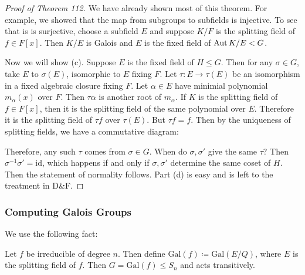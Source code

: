 \documentclass[10pt, twoside]{article}
\newcommand{\Gal}[1]{\mathrm{Gal}(#1)}
\begin{document}
    \begin{proof}[Proof of Theorem 112]
        We have already shown most of this theorem. For example, we showed that the map from subgroups to subfields is injective. To see that is is surjective, choose a subfield $E$ and suppose $K/F$ is the splitting field of $f \in F[x]$. Then $K/E$ is Galois and $E$ is the fixed field of $\operatorname{Aut}{K/E} < G$.

        Now we will show (c). Suppose $E$ is the fixed field of $H \leq G$. Then for any $\sigma \in G$, take $E$ to $\sigma(E)$, isomorphic to $E$ fixing $F$. Let $\tau: E \to \tau(E)$ be an isomorphism in a fixed algebraic closure fixing $F$. Let $\alpha \in E$ have minimial polynomial $m_{\alpha}(x)$ over $F$. Then $\tau \alpha$ is another root of $m_{\alpha}$. If $K$ is the splitting field of $f \in F[x]$, then it is the splitting field of the same polynomial over $E$. Therefore it is the splitting field of $\tau f$ over $\tau(E)$. But $\tau f = f$. Then by the uniqueness of splitting fields, we have a commutative diagram: 
        \begin{center}
        \end{center}
        Therefore, any such $\tau$ comes from $\sigma \in G$. When do $\sigma, \sigma'$ give the same $\tau$? Then $\sigma^{-1}\sigma' = \mathrm{id}$, which happens if and only if $\sigma, \sigma'$ determine the same coset of $H$. Then the statement of normality follows. Part (d) is easy and is left to the treatment in D\&F.
    \end{proof}

        \subsubsection{Computing Galois Groups}%
        We use the following fact:
        \begin{prop}
            Let $f$ be irreducible of degree $n$. Then define $\Gal{f} \coloneqq \Gal{E/Q}$, where $E$ is the splitting field of $f$. Then $G = \Gal{f} \leq S_n$ and acts transitively.
        \end{prop}
\end{document}
